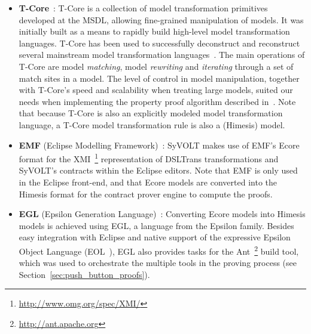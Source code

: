 \begin{itemize}
  \item \textbf{T-Core}~\cite{Syriani2010a}: T-Core is a collection of model transformation
  primitives developed at the MSDL, allowing fine-grained manipulation of
  models. It was initially built as a means to rapidly build
  high-level model transformation languages. T-Core has been used to
  successfully deconstruct and reconstruct several mainstream model transformation
  languages~\cite{}. The main operations of T-Core are model \emph{matching},
  model \emph{rewriting} and \emph{iterating} through a set of match sites in a model.
  The level of control in model manipulation, together with T-Core's speed and
  scalability when treating large models, suited our needs when
  implementing the property proof algorithm described in~\cite{Lucio2014}. Note that because
  T-Core is also an explicitly modeled model transformation language, a T-Core
  model transformation rule is also a (Himesis) model.\\

  \item \textbf{EMF} (Eclipse Modelling Framework)~\cite{emfTool}: SyVOLT makes
  use of EMF's Ecore format for the
  XMI~\footnote{\url{http://www.omg.org/spec/XMI/}} representation of DSLTrans
  transformations and SyVOLT's contracts within the Eclipse editors.
  Note that EMF is only used in the Eclipse front-end, and that Ecore models are converted
  into the Himesis format for the contract prover engine to compute the
  proofs.\\

  \item \textbf{EGL} (Epsilon Generation Language)~\cite{eglTool}: Converting
  Ecore models into Himesis models is achieved using EGL, a language from the
  Epsilon family. Besides easy integration with Eclipse and native support of
  the expressive
Epsilon Object Language (EOL~\cite{Kolovos}), EGL also provides tasks for the
Ant~\footnote{\url{http://ant.apache.org}} build tool, which was used to
orchestrate the multiple tools in the proving process (see
Section~\ref{sec:push_button_proofs}).\\
\end{itemize}


